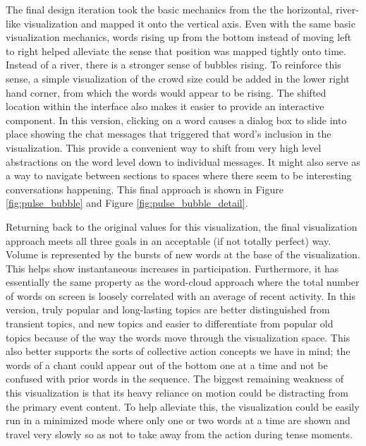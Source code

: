 The final design iteration took the basic mechanics from the the horizontal, river-like visualization and mapped it onto the vertical axis. Even with the same basic visualization mechanics, words rising up from the bottom instead of moving left to right helped alleviate the sense that position was mapped tightly onto time. Instead of a river, there is a stronger sense of bubbles rising. To reinforce this sense, a simple visualization of the crowd size could be added in the lower right hand corner, from which the words would appear to be rising. The shifted location within the interface also makes it easier to provide an interactive component. In this version, clicking on a word causes a dialog box to slide into place showing the chat messages that triggered that word's inclusion in the visualization. This provide a convenient way to shift from very high level abstractions on the word level down to individual messages. It might also serve as a way to navigate between sections to spaces where there seem to be interesting conversations happening. This final approach is shown in Figure \ref{fig:pulse_bubble} and Figure \ref{fig:pulse_bubble_detail}.



Returning back to the original values for this visualization, the final visualization approach meets all three goals in an acceptable (if not totally perfect) way. Volume is represented by the bursts of new words at the base of the visualization. This helps show instantaneous increases in participation. Furthermore, it has essentially the same property as the word-cloud approach where the total number of words on screen is loosely correlated with an average of recent activity. In this version, truly popular and long-lasting topics are better distinguished from transient topics, and new topics and easier to differentiate from popular old topics because of the way the words move through the visualization space. This also better supports the sorts of collective action concepts we have in mind; the words of a chant could appear out of the bottom one at a time and not be confused with prior words in the sequence. The biggest remaining weakness of this visualization is that its heavy reliance on motion could be distracting from the primary event content. To help alleviate this, the visualization could be easily run in a minimized mode where only one or two words at a time are shown and travel very slowly so as not to take away from the action during tense moments.

